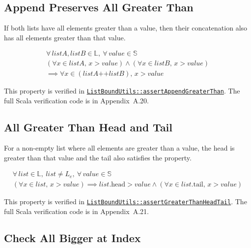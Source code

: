 \subsection{Append Preserves All Greater Than}

If both lists have all elements greater than a value, then their
concatenation also has all elements greater than that value.

\begin{gather*}
\forall\, listA, listB \in \mathbb{L},\ \forall\, value \in \mathbb{S} \\
(\forall x \in listA,\, x > value) \wedge (\forall x \in listB,\, x > value) \\
\implies \forall x \in (listA \mathbin{\texttt{++}} listB),\, x > value
\end{gather*}

{\raggedright
This property is verified in
\href{https://github.com/thiagomata/prime-numbers/blob/list-article-v1.0.0/src/main/scala/v1/chapter3/list/ListBoundUtils.scala}{\texttt{ListBoundUtils::\allowbreak assertAppendGreaterThan}}.
The full Scala verification code is in Appendix~A.20.
\par}

\subsection{All Greater Than Head and Tail}

For a non-empty list where all elements are greater than a value, the
head is greater than that value and the tail also satisfies the
property.

\begin{gather*}
\forall\, list \in \mathbb{L},\ list \neq L_e,\ \forall\, value \in \mathbb{S} \\
(\forall x \in list,\, x > value) \implies list.\text{head} > value \wedge (\forall x \in list.\text{tail},\, x > value)
\end{gather*}

{\raggedright
This property is verified in
\href{https://github.com/thiagomata/prime-numbers/blob/list-article-v1.0.0/src/main/scala/v1/chapter3/list/ListBoundUtils.scala}{\texttt{ListBoundUtils::\allowbreak assertGreaterThanHeadTail}}.
The full Scala verification code is in Appendix~A.21.
\par}

\subsection{Check All Bigger at Index}

